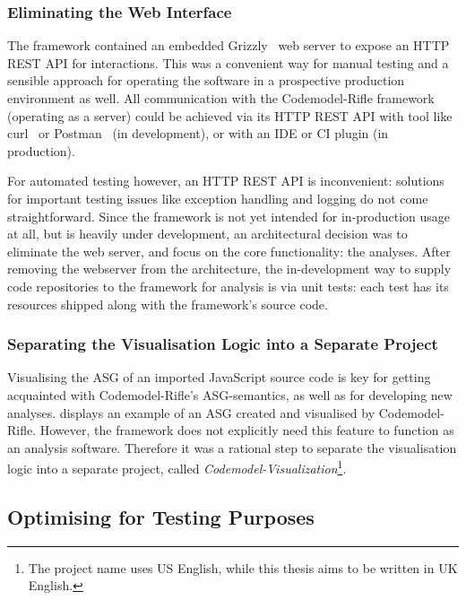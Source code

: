 \subsubsection{Eliminating the Web Interface}

The framework contained an embedded Grizzly~\cite{grizzly-website} web server to expose an HTTP REST API for interactions. This was a convenient way for manual testing and a sensible approach for operating the software in a prospective production environment as well. All communication with the Codemodel-Rifle framework (operating as a server) could be achieved via its HTTP REST API with tool like curl~\cite{curl-website} or Postman~\cite{postman-website} (in development), or with an IDE or CI plugin (in production).

For automated testing however, an HTTP REST API is inconvenient: solutions for important testing issues like exception handling and logging do not come straightforward. Since the framework is not yet intended for in-production usage at all, but is heavily under development, an architectural decision was to eliminate the web server, and focus on the core functionality: the analyses. After removing the webserver from the architecture, the in-development way to supply code repositories to the framework for analysis is via unit tests: each test has its resources shipped along with the framework's source code.


\subsubsection{Separating the Visualisation Logic into a Separate Project}

Visualising the ASG of an imported JavaScript source code is key for getting acquainted with Codemodel-Rifle's ASG-semantics, as well as for developing new analyses.  displays an example of an ASG created and visualised by Codemodel-Rifle. However, the framework does not explicitly need this feature to function as an analysis software. Therefore it was a rational step to separate the visualisation logic into a separate project, called \emph{Codemodel-Visualization}\footnote{The project name uses US English, while this thesis aims to be written in UK English.}.


\subsection{Optimising for Testing Purposes}

